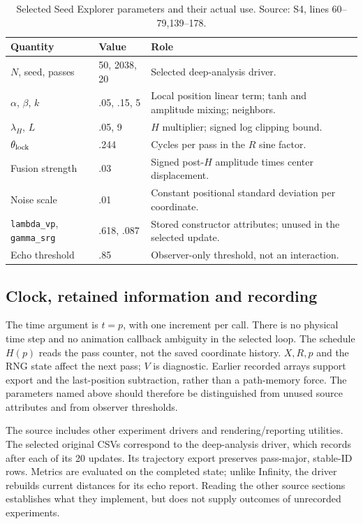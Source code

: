 \documentclass[11pt,a4paper]{article}
\newcommand{\src}[2]{\textsf{#1}, lines #2}
\begin{document}
\begin{table}[ht]
\centering\small\caption{Selected Seed Explorer parameters and their actual use. Source: \src{S4}{60--79,139--178}.}
\begin{tabularx}{\linewidth}{@{}l l X@{}}\toprule
Quantity & Value & Role\\\midrule
$N$, seed, passes & 50, 2038, 20 & Selected deep-analysis driver.\\
$\alpha$, $\beta$, $k$ & .05, .15, 5 & Local position linear term; tanh and amplitude mixing; neighbors.\\
$\lambda_H$, $L$ & .05, 9 & $H$ multiplier; signed log clipping bound.\\
$\theta_{\rm lock}$ & .244 & Cycles per pass in the $R$ sine factor.\\
Fusion strength & .03 & Signed post-$H$ amplitude times center displacement.\\
Noise scale & .01 & Constant positional standard deviation per coordinate.\\
\texttt{lambda\_vp}, \texttt{gamma\_srg} & .618, .087 & Stored constructor attributes; unused in the selected update.\\
Echo threshold & .85 & Observer-only threshold, not an interaction.\\
\bottomrule\end{tabularx}
\end{table}

\subsection{Clock, retained information and recording}
The time argument is $t=p$, with one increment per call. There is no physical time step and no animation callback ambiguity in the selected loop. The schedule $H(p)$ reads the pass counter, not the saved coordinate history. $X,R,p$ and the RNG state affect the next pass; $V$ is diagnostic. Earlier recorded arrays support export and the last-position subtraction, rather than a path-memory force. The parameters named above should therefore be distinguished from unused source attributes and from observer thresholds.

The source includes other experiment drivers and rendering/reporting utilities. The selected original CSVs correspond to the deep-analysis driver, which records after each of its 20 updates. Its trajectory export preserves pass-major, stable-ID rows. Metrics are evaluated on the completed state; unlike Infinity, the driver rebuilds current distances for its echo report. Reading the other source sections establishes what they implement, but does not supply outcomes of unrecorded experiments.
\end{document}
